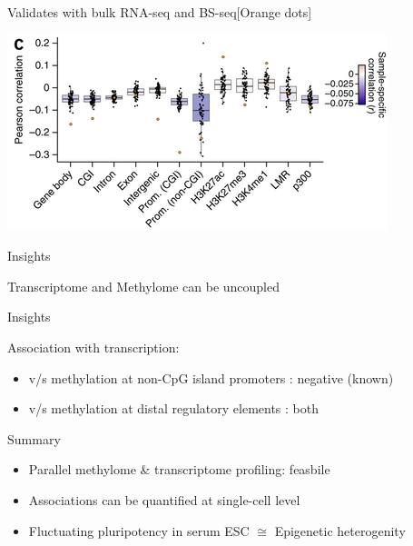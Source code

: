 \documentclass[10pt, compress]{beamer}
\renewcommand{\(}{\begin{columns}}
\renewcommand{\)}{\end{columns}}
\newcommand{\<}[1]{\begin{column}{#1}}
\renewcommand{\>}{\end{column}}
\begin{document}
\begin{frame}
	Validates with bulk RNA-seq and BS-seq[Orange dots]
	\begin{center}
		\includegraphics[width=\linewidth,height=\textheight,keepaspectratio]{images/corr2}
	\end{center}
\end{frame}

\begin{frame}[fragile]
	\begin{center} \Large Insights \end{center}
	
 	\centering \large Transcriptome and Methylome can be uncoupled
	
\end{frame}

\begin{frame}[fragile]
	\begin{center}	 \Large Insights \end{center}
Association with transcription: \begin{itemize}
	\item v/s methylation at non-CpG island promoters : negative (known)
	\item v/s methylation at distal regulatory elements : both
\end{itemize}
\end{frame}



\begin{frame}[fragile]
	\centering \Large Summary
\begin{itemize}
		\item Parallel methylome \& transcriptome profiling: feasbile
		\item Associations can be quantified at single-cell level
		\item Fluctuating pluripotency in serum ESC $\cong$ Epigenetic heterogenity
	\end{itemize}
\end{frame}
\end{document}
